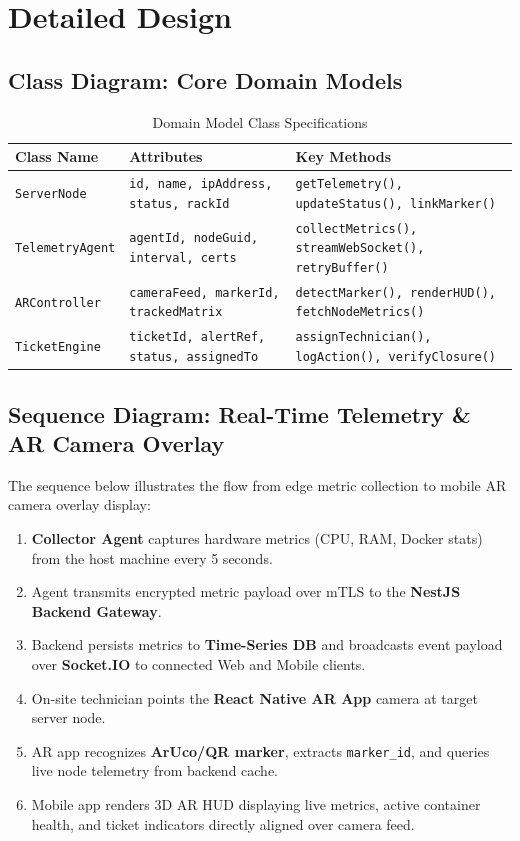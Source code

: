 \section{Detailed Design}

\subsection{Class Diagram: Core Domain Models}
\begin{table}[H]
    \centering
    \caption{Domain Model Class Specifications}
    \begin{tabular}{|l|l|p{7cm}|}
        \hline
        \textbf{Class Name} & \textbf{Attributes} & \textbf{Key Methods} \\ \hline
        \texttt{ServerNode} & \texttt{id, name, ipAddress, status, rackId} & \texttt{getTelemetry(), updateStatus(), linkMarker()} \\ \hline
        \texttt{TelemetryAgent} & \texttt{agentId, nodeGuid, interval, certs} & \texttt{collectMetrics(), streamWebSocket(), retryBuffer()} \\ \hline
        \texttt{ARController} & \texttt{cameraFeed, markerId, trackedMatrix} & \texttt{detectMarker(), renderHUD(), fetchNodeMetrics()} \\ \hline
        \texttt{TicketEngine} & \texttt{ticketId, alertRef, status, assignedTo} & \texttt{assignTechnician(), logAction(), verifyClosure()} \\ \hline
    \end{tabular}
\end{table}

\subsection{Sequence Diagram: Real-Time Telemetry \& AR Camera Overlay}
The sequence below illustrates the flow from edge metric collection to mobile AR camera overlay display:

\begin{enumerate}
    \item \textbf{Collector Agent} captures hardware metrics (CPU, RAM, Docker stats) from the host machine every 5 seconds.
    \item Agent transmits encrypted metric payload over mTLS to the \textbf{NestJS Backend Gateway}.
    \item Backend persists metrics to \textbf{Time-Series DB} and broadcasts event payload over \textbf{Socket.IO} to connected Web and Mobile clients.
    \item On-site technician points the \textbf{React Native AR App} camera at target server node.
    \item AR app recognizes \textbf{ArUco/QR marker}, extracts \texttt{marker\_id}, and queries live node telemetry from backend cache.
    \item Mobile app renders 3D AR HUD displaying live metrics, active container health, and ticket indicators directly aligned over camera feed.
\end{enumerate}
